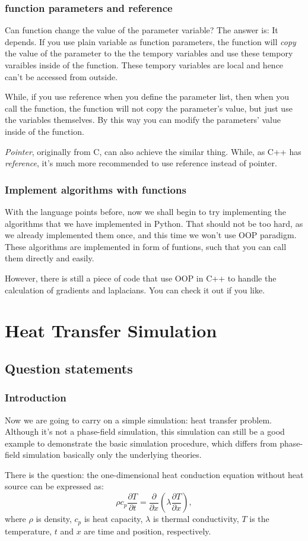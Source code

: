 \documentclass[compress,xcolor={dvipsnames}]{beamer}
\begin{document}
\begin{frame}[fragile]
    \frametitle{function parameters and reference}

    Can function change the value of the parameter variable? The answer is: It depends. If you use plain variable as function parameters, the function will \emph{copy} the value of the parameter to the the tempory variables and use these tempory varaibles inside of the function. These tempory variables are local and hence can't be accessed from outside.

    While, if you use reference when you define the parameter list, then when you call the function, the function will not copy the parameter's value, but just use the variables themselves. By this way you can modify the parameters' value inside of the function.

    \emph{Pointer}, originally from C, can also achieve the similar thing. While, as C++ has \emph{reference}, it's much more recommended to use reference instead of pointer.

\end{frame}

\begin{frame}
    \frametitle{Implement algorithms with functions}

    With the language points before, now we shall begin to try implementing the algorithms that we have implemented in Python. That should not be too hard, as we already implemented them once, and this time we won't use OOP paradigm. These algorithms are implemented in form of funtions, such that you can call them directly and easily.

    However, there is still a piece of code that use OOP in C++ to handle the calculation of gradients and laplacians. You can check it out if you like.

\end{frame}

\section{Heat Transfer Simulation}
\subsection{Question statements}
\begin{frame}
    \frametitle{Introduction}

    Now we are going to carry on a simple simulation: heat transfer problem. Although it's not a phase-field simulation, this simulation can still be a good example to demonstrate the basic simulation procedure, which differs from phase-field simulation basically only the underlying theories.

    There is the question: the one-dimensional heat conduction equation without heat source can be expressed as:
    \[
        \rho c_p \frac{\partial T}{\partial t} = \frac{\partial }{\partial x}\left( \lambda\frac{\partial T}{\partial x} \right),
    \]
    where \(\rho\) is density, \(c_p\) is heat capacity, \(\lambda\) is thermal conductivity, \(T\) is the temperature, \(t\) and \(x\) are time and position, respectively.
\end{frame}
\end{document}
